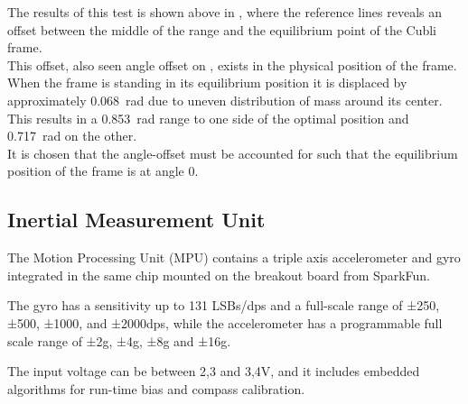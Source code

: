 \begin{minipage}{\linewidth}
\begin{minipage}{0.45\linewidth}
\begin{figure}[H]
  			\centering
  			\captionsetup{justification=centering}
  			\vspace{-.5cm}
  			\label{PotentiometerResolutionRadDeg}
  		\end{figure}\vspace{-5mm}
  	\end{minipage}
\end{minipage}

The results of this test is shown above in , where the reference lines reveals an offset between the middle of the range and the equilibrium point of the Cubli frame.\\
This offset, also seen angle offset on , exists in the physical position of the frame. When the frame is standing in its equilibrium position it is displaced by approximately \SI{0,068}{rad} due to uneven distribution of mass around its center.\\
This results in a \SI{0,853}{rad} range to one side of the optimal position and \SI{0,717}{rad} on the other.\\
It is chosen that the angle-offset must be accounted for such that the equilibrium position of the frame is at angle 0.


\subsection{Inertial Measurement Unit}
The Motion Processing Unit (MPU) contains a triple axis accelerometer and gyro integrated in the same chip mounted on the breakout board from SparkFun.

The gyro has a sensitivity up to 131 LSBs/dps and a full-scale range of ±250, ±500, ±1000, and ±2000dps, while the accelerometer has a programmable full scale range of ±2g, ±4g, ±8g and ±16g.

The input voltage can be between 2,3 and 3,4V, and it includes embedded algorithms for run-time bias and compass calibration.

